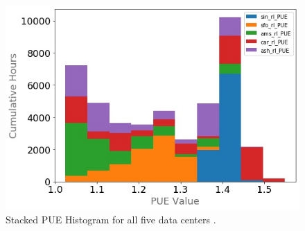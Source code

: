 \begin{figure}[!h]
  \centering
  \includegraphics[scale=0.4]{building_energy_model/img/pue.jpg}
  \caption[Stacked PUE Histogram]{Stacked PUE Histogram for all five data centers .}
  \label{fig:stacked_pue}
  \end{figure}